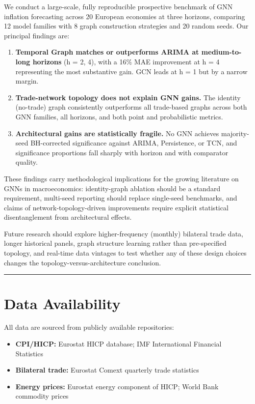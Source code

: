 \documentclass[
  11pt,
  a4paper]{article}
\providecommand{\tightlist}{%
  \setlength{\itemsep}{0pt}\setlength{\parskip}{0pt}}
\begin{document}
We conduct a large-scale, fully reproducible prospective benchmark of
GNN inflation forecasting across 20 European economies at three
horizons, comparing 12 model families with 8 graph construction
strategies and 20 random seeds. Our principal findings are:

\begin{enumerate}
\def\labelenumi{\arabic{enumi}.}
\tightlist
\item
  \textbf{Temporal Graph matches or outperforms ARIMA at medium-to-long
  horizons} (h = 2, 4), with a 16\% MAE improvement at h = 4
  representing the most substantive gain. GCN leads at h = 1 but by a
  narrow margin.
\item
  \textbf{Trade-network topology does not explain GNN gains.} The
  identity (no-trade) graph consistently outperforms all trade-based
  graphs across both GNN families, all horizons, and both point and
  probabilistic metrics.
\item
  \textbf{Architectural gains are statistically fragile.} No GNN
  achieves majority-seed BH-corrected significance against ARIMA,
  Persistence, or TCN, and significance proportions fall sharply with
  horizon and with comparator quality.
\end{enumerate}

These findings carry methodological implications for the growing
literature on GNNs in macroeconomics: identity-graph ablation should be
a standard requirement, multi-seed reporting should replace single-seed
benchmarks, and claims of network-topology-driven improvements require
explicit statistical disentanglement from architectural effects.

Future research should explore higher-frequency (monthly) bilateral
trade data, longer historical panels, graph structure learning rather
than pre-specified topology, and real-time data vintages to test whether
any of these design choices changes the topology-versus-architecture
conclusion.

\begin{center}\rule{0.5\linewidth}{0.5pt}\end{center}

\section{Data Availability}\label{data-availability}

All data are sourced from publicly available repositories:

\begin{itemize}
\tightlist
\item
  \textbf{CPI/HICP:} Eurostat HICP database; IMF International Financial
  Statistics
\item
  \textbf{Bilateral trade:} Eurostat Comext quarterly trade statistics
\item
  \textbf{Energy prices:} Eurostat energy component of HICP; World Bank
  commodity prices
\end{itemize}
\end{document}
